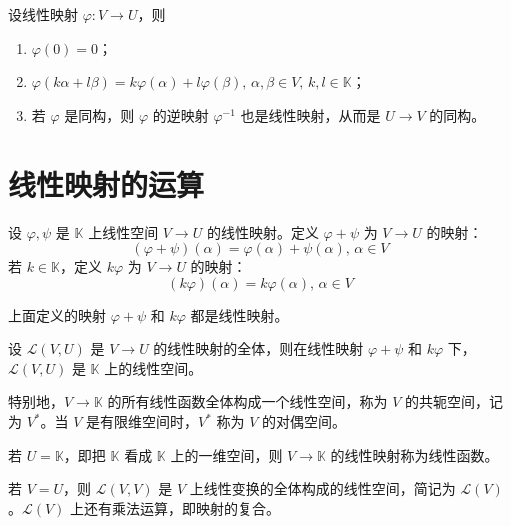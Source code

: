 \hfill

\begin{proposition}
    设线性映射 $\varphi : V \to U$，则
    \begin{enumerate}
        \item $\varphi(0) = 0$；
        \item $\varphi(k\alpha + l\beta) = k\varphi(\alpha) + l\varphi(\beta),\, \alpha,\beta \in V,\, k,l \in \mathbb{K}$；
        \item 若 $\varphi$ 是同构，则 $\varphi$ 的逆映射 $\varphi^{-1}$ 也是线性映射，从而是 $U \to V$ 的同构。
    \end{enumerate}
\end{proposition}




\section{线性映射的运算}

\begin{definition}
    设 $\varphi,\psi$ 是 $\mathbb{K}$ 上线性空间 $V \to U$ 的线性映射。定义 $\varphi + \psi$ 为 $V \to U$ 的映射：
    \[(\varphi + \psi)(\alpha) = \varphi(\alpha) + \psi(\alpha),\, \alpha \in  V\]
    若 $k \in \mathbb{K}$，定义 $k\varphi$ 为 $V \to U$ 的映射：
    \[(k\varphi)(\alpha) = k\varphi(\alpha),\, \alpha \in V\]
\end{definition}

\begin{proposition}
    上面定义的映射 $\varphi + \psi$ 和 $k\varphi$ 都是线性映射。
\end{proposition}

\begin{proposition}
    设 $\mathcal{L}(V,U)$ 是 $V \to U$ 的线性映射的全体，则在线性映射 $\varphi + \psi$ 和 $k\varphi$ 下，$\mathcal{L}(V,U)$ 是 $\mathbb{K}$ 上的线性空间。

    特别地，$V \to \mathbb{K}$ 的所有线性函数全体构成一个线性空间，称为 $V$ 的共轭空间，记为 $V^*$。当 $V$ 是有限维空间时，$V^*$ 称为 $V$ 的对偶空间。
\end{proposition}

\begin{remark}
    若 $U = \mathbb{K}$，即把 $\mathbb{K}$ 看成 $\mathbb{K}$ 上的一维空间，则 $V \to \mathbb{K}$ 的线性映射称为线性函数。
\end{remark}

\begin{remark}
  若 $V = U$，则 $\mathcal{L}(V,V)$ 是 $V$ 上线性变换的全体构成的线性空间，简记为 $\mathcal{L}(V)$。$\mathcal{L}(V)$ 上还有乘法运算，即映射的复合。
\end{remark}

